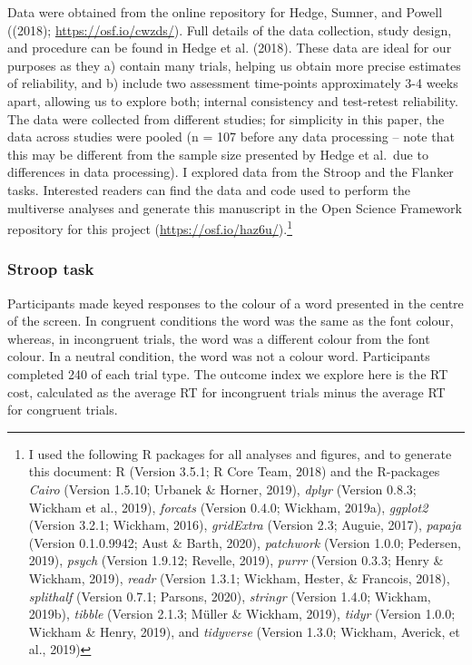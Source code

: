 \documentclass[english,man,floatsintext]{apa6}
\begin{document}
Data were obtained from the online repository for Hedge, Sumner, and Powell ((2018); \url{https://osf.io/cwzds/}). Full details of the data collection, study design, and procedure can be found in Hedge et al. (2018). These data are ideal for our purposes as they a) contain many trials, helping us obtain more precise estimates of reliability, and b) include two assessment time-points approximately 3-4 weeks apart, allowing us to explore both; internal consistency and test-retest reliability. The data were collected from different studies; for simplicity in this paper, the data across studies were pooled (n = 107 before any data processing -- note that this may be different from the sample size presented by Hedge et al.~due to differences in data processing). I explored data from the Stroop and the Flanker tasks. Interested readers can find the data and code used to perform the multiverse analyses and generate this manuscript in the Open Science Framework repository for this project (\url{https://osf.io/haz6u/}).\footnote{I used the following R packages for all analyses and figures, and to generate this document: R (Version 3.5.1; R Core Team, 2018) and the R-packages \emph{Cairo} (Version 1.5.10; Urbanek \& Horner, 2019), \emph{dplyr} (Version 0.8.3; Wickham et al., 2019), \emph{forcats} (Version 0.4.0; Wickham, 2019a), \emph{ggplot2} (Version 3.2.1; Wickham, 2016), \emph{gridExtra} (Version 2.3; Auguie, 2017), \emph{papaja} (Version 0.1.0.9942; Aust \& Barth, 2020), \emph{patchwork} (Version 1.0.0; Pedersen, 2019), \emph{psych} (Version 1.9.12; Revelle, 2019), \emph{purrr} (Version 0.3.3; Henry \& Wickham, 2019), \emph{readr} (Version 1.3.1; Wickham, Hester, \& Francois, 2018), \emph{splithalf} (Version 0.7.1; Parsons, 2020), \emph{stringr} (Version 1.4.0; Wickham, 2019b), \emph{tibble} (Version 2.1.3; Müller \& Wickham, 2019), \emph{tidyr} (Version 1.0.0; Wickham \& Henry, 2019), and \emph{tidyverse} (Version 1.3.0; Wickham, Averick, et al., 2019)}

\hypertarget{stroop-task}{%
\subsubsection{Stroop task}\label{stroop-task}}

Participants made keyed responses to the colour of a word presented in the centre of the screen. In congruent conditions the word was the same as the font colour, whereas, in incongruent trials, the word was a different colour from the font colour. In a neutral condition, the word was not a colour word. Participants completed 240 of each trial type. The outcome index we explore here is the RT cost, calculated as the average RT for incongruent trials minus the average RT for congruent trials.
\end{document}
